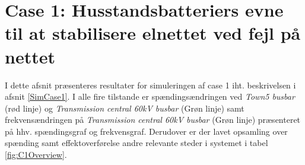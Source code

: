
\label{ResultatOgDiskussion}

\section{Case 1: Husstandsbatteriers evne til at stabilisere elnettet ved fejl på nettet}
I dette afsnit præsenteres resultater for simuleringen af case 1 iht. beskrivelsen i afsnit \ref{SimCase1}. I alle fire tilstande er spændingsændringen ved \textit{Town5 busbar} (rød linje) og \textit{Transmission central 60kV busbar} (Grøn linje) samt frekvensændringen på \textit{Transmission central 60kV busbar} (Grøn linje) præsenteret på hhv. spændingsgraf og frekvensgraf. Derudover er der lavet opsamling over spænding samt effektoverførelse andre relevante steder i systemet i tabel \ref{fig:C1Overview}. \\ \\

